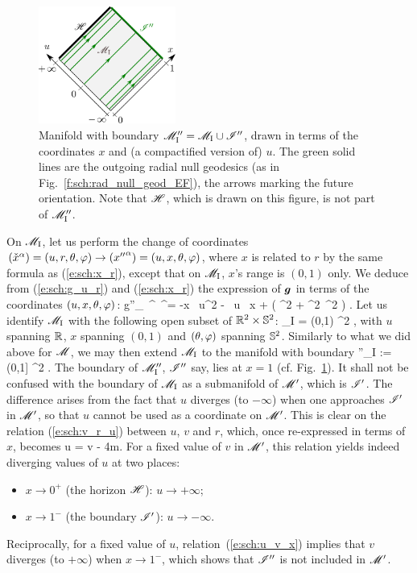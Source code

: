 \begin{figure}
\centerline{\includegraphics[width=0.4\textwidth]{sch_conf_compl2.pdf}}
\caption[]{\label{f:sch:conf_compl2} \footnotesize
Manifold with boundary
$\mathscr{M}''_{\rm I} = \mathscr{M}_{\rm I}\cup\mathscr{I}''$, drawn in terms of
the coordinates $x$ and (a compactified version of) $u$.
The green solid lines are the outgoing radial null geodesics (as in Fig.~\ref{f:sch:rad_null_geod_EF}), the arrows marking the future orientation.
Note that $\mathscr{H}$, which is drawn on this figure, is not part of $\mathscr{M}''_{\rm I}$.}
\end{figure}

On $\mathscr{M}_{\rm I}$, let us perform the change of coordinates
$(\check{x}^\alpha) = (u,r,\theta,\varphi) \rightarrow ({x''}^\alpha) = (u,x,\theta,\varphi)$,
where $x$ is related to $r$ by the same formula as (\ref{e:sch:x_r}),
except that on $\mathscr{M}_{\rm I}$, $x$'s range is $(0,1)$ only.
We deduce from (\ref{e:sch:g_u_r}) and (\ref{e:sch:x_r})
the expression of $\bm{g}$ in terms of the coordinates $(u,x,\theta,\varphi)$:
\be
        {g''}_{\mu\nu}\, ^\mu \, ^\nu =
            -x \, \D u^2
            - \, \D u \, \D x
        +   \left( \D\th^2 + \sin^2\th\, \D\ph^2 \right) .
\ee
Let us identify $\mathscr{M}_{\rm I}$ with the following open subset of
$\mathbb{R}^2\times \mathbb{S}^2$:
\be
    \M_{\rm I} = \R \times (0,1) \times \SS^2 ,
\ee
with $u$ spanning $\mathbb{R}$, $x$ spanning $(0,1)$ and $(\theta,\varphi)$
spanning $\mathbb{S}^2$. Similarly to what we did above for $\mathscr{M}$, we may then
extend $\mathscr{M}_{\rm I}$ to the manifold with boundary
\be
    \M''_{\rm I} :=  \R \times (0,1] \times \SS^2 .
\ee
The boundary of $\mathscr{M}''_{\rm I}$, $\mathscr{I}''$ say, lies at $x=1$
(cf. Fig.~\ref{f:sch:conf_compl2}). It shall not be
confused with the boundary of $\mathscr{M}_{\rm I}$ as a submanifold of $\mathscr{M}'$, which is
$\mathscr{I}'$. The difference arises from the fact that $u$ diverges (to $-\infty$)
when one approaches $\mathscr{I}'$ in $\mathscr{M}'$, so that $u$ cannot be used as a
coordinate on $\mathscr{M}'$. This is clear on the relation (\ref{e:sch:v_r_u})
between $u$, $v$ and $r$, which, once re-expressed in terms of $x$, becomes
\be \label{e:sch:u_v_x}
    u = v - 4m.
\ee
For a fixed value of $v$ in $\mathscr{M}'$, this relation yields indeed diverging values of
$u$ at two places:
\begin{itemize}
\item $x\rightarrow 0^+$ (the horizon $\mathscr{H}$): $u\rightarrow +\infty$;
\item $x\rightarrow 1^-$ (the boundary $\mathscr{I}'$): $u\rightarrow -\infty$.
\end{itemize}
Reciprocally, for a fixed value of $u$, relation~(\ref{e:sch:u_v_x})
implies that $v$ diverges (to $+\infty$) when $x\rightarrow 1^-$, which shows that
$\mathscr{I}''$ is not included in $\mathscr{M}'$.

